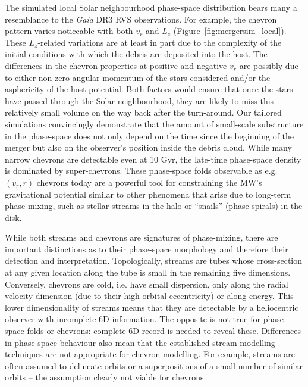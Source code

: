 \documentclass[a4paper,useAMS,usenatbib]{mnras}
\begin{document}
The simulated local Solar neighbourhood phase-space distribution bears many a resemblance to the {\it Gaia} DR3 RVS observations. For example, the chevron pattern varies noticeable with both $v_r$ and $L_z$ (Figure~\ref{fig:mergersim_local}). These $L_z$-related variations are at least in part due to the complexity of the initial conditions with which the debris are deposited into the host. The differences in the chevron properties at positive and negative $v_r$ are possibly due to either non-zero angular momentum of the stars considered and/or the asphericity of the host potential. Both factors would ensure that once the stars have passed through the Solar neighbourhood, they are likely to miss this relatively small volume on the way back after the turn-around. Our tailored simulations convincingly demonstrate that the amount of small-scale substructure in the phase-space does not only depend on the time since the beginning of the merger but also on the observer's position inside the debris cloud. While many narrow chevrons are detectable even at 10 Gyr, the late-time phase-space density is dominated by super-chevrons. These phase-space folds observable as e.g. $(v_r, r)$ chevrons today are a powerful tool for constraining the MW's gravitational potential similar to other phenomena that arise due to long-term phase-mixing, such as stellar streams in the halo or ``snails'' (phase spirals) in the disk.

While both streams and chevrons are signatures of phase-mixing, there are important distinctions as to their phase-space morphology and therefore their detection and interpretation. Topologically, streams are tubes whose cross-section at any given location along the tube is small in the remaining five dimensions. Conversely, chevrons are cold, i.e. have small dispersion, only along the radial velocity dimension (due to their high orbital eccentricity) or along energy. This lower dimensionality of streams means that they are detectable by a heliocentric observer with incomplete 6D information. The opposite is not true for phase-space folds or chevrons: complete 6D record is needed to reveal these. Differences in phase-space behaviour also mean that the established stream modelling techniques are not appropriate for chevron modelling. For example, streams are often assumed to delineate orbits or a superpositions of a small number of similar orbits -- the assumption clearly not viable for chevrons.
\end{document}
